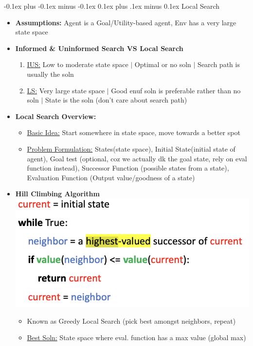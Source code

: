 \documentclass[landscape]{article}
\makeatletter
\renewcommand{\subsection}{\@startsection{subsection}{2}{0mm}%
  {-0.1ex plus -0.1ex minus -0.1ex}%
  {0.1ex plus .1ex minus 0.1ex}%
{\normalfont\scriptsize\bfseries}}
\makeatother
\begin{document}
\begin{multicols*}{5}
    \subsection{Local Search}
    \begin{itemize}
      \item \textbf{Assumptions:} Agent is a Goal/Utility-based agent, Env has a very large state space
      \item \textbf{Informed \& Uninformed Search VS Local Search}
      \begin{enumerate}
        \item \underline{IUS:} Low to moderate state space $\vert$ Optimal or no soln $\vert$ Search path is usually the soln
        \item \underline{LS:} Very large state space $\vert$ Good enuf soln is preferable rather than no soln $\vert$ State is the soln (don't care about search path)
      \end{enumerate}
      \item \textbf{Local Search Overview:}
      \begin{itemize}
        \item \underline{Basic Idea:} Start somewhere in state space, move towards a better spot
        \item \underline{Problem Formulation:} States(state space), Initial State(initial state of agent), Goal test (optional, coz we actually dk the goal state, rely on eval function instead), Successor Function (possible states from a state), Evaluation Function (Output value/goodness of a state)
      \end{itemize}
      \item \textbf{Hill Climbing Algorithm}
      \includegraphics[width=0.75\linewidth]{4_hillclimbing.png}
      \begin{itemize}
        \item Known as Greedy Local Search (pick best amongst neighbors, repeat)
        \item \underline{Best Soln:} State space where eval. function has a max value (global max)

\end{itemize}
\end{itemize}
\end{multicols*}
\end{document}
